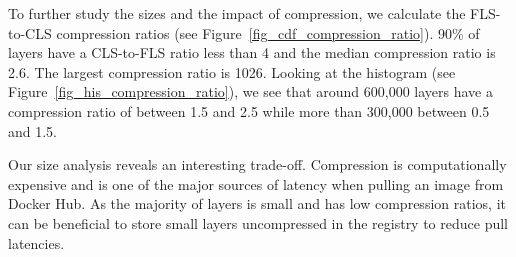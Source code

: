 To further study the sizes and the impact of compression, we calculate
the FLS-to-CLS compression ratios (see Figure~\ref{fig_cdf_compression_ratio}).
%
%
90\% of layers have a  CLS-to-FLS ratio less than 4 and the median
compression ratio is 2.6. The largest compression ratio is 1026.
%
%
%
%
Looking at the histogram (see Figure~\ref{fig_his_compression_ratio}), we see
that around 600,000 layers have a compression ratio of between 1.5 and 2.5 while more than
300,000 between 0.5 and 1.5.
%

Our size analysis reveals an interesting trade-off. Compression is computationally
expensive and is one of the major sources of latency when pulling an image from Docker Hub.
As the majority of layers is small and has low compression ratios, it can
be beneficial to store small layers uncompressed in the registry to reduce pull latencies.


